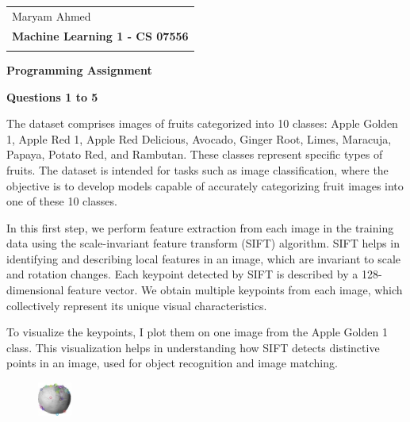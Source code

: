 \documentclass[a4paper,10 pt]{article}
\begin{document}
\thispagestyle{empty} 

\begin{tabular}{p{15.5cm}} 
	Maryam Ahmed \\
{\large \bf Machine Learning 1 - CS 07556} \\

\hline 
\\
\end{tabular} 

\vspace*{0.3cm} 

\begin{center} 
	{\Large \bf Programming Assignment} 
	\vspace{2mm}
	
		
\end{center}  

\vspace{0.4cm}


{\Large \textbf {Questions 1 to 5}}

\vspace{12pt}

The dataset comprises images of fruits categorized into 10 classes: Apple Golden 1, Apple Red 1, Apple Red Delicious, Avocado, Ginger Root, Limes, Maracuja, Papaya, Potato Red, and Rambutan. These classes represent specific types of fruits. The dataset is intended for tasks such as image classification, where the objective is to develop models capable of accurately categorizing fruit images into one of these 10 classes. \cite{muresan2018fruit}

\vspace{12pt}

In this first step, we perform feature extraction from each image in the training data using the scale-invariant feature transform (SIFT) algorithm. SIFT helps in identifying and describing local features in an image, which are invariant to scale and rotation changes. Each keypoint detected by SIFT is described by a 128-dimensional feature vector. We obtain multiple keypoints from each image, which collectively represent its unique visual characteristics.

\vspace{12pt}

To visualize the keypoints, I plot them on one image from the Apple Golden 1 class. This visualization helps in understanding how SIFT detects distinctive points in an image, used for object recognition and image matching.

\begin{figure}[H]
    \centering
    \includegraphics[width=0.1\textwidth]{ImageQ3a.jpeg} %
  \end{figure}
  
\end{document}
